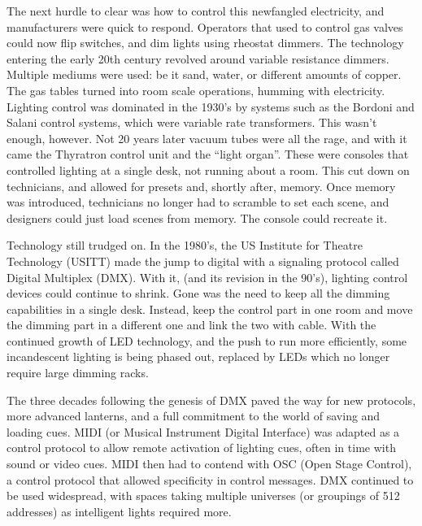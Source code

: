 \documentclass[12pt,twoside]{reedthesis}
\begin{document}
The next hurdle to clear was how to control this newfangled electricity, and manufacturers were quick to respond. Operators that used to control gas valves could now flip switches, and dim lights using rheostat dimmers. The technology entering the early 20th century revolved around variable resistance dimmers. Multiple mediums were used: be it sand, water, or different amounts of copper. The gas tables turned into room scale operations, humming with electricity. Lighting control was dominated in the 1930’s by systems such as the Bordoni and Salani control systems, which were variable rate transformers. 
This wasn’t enough, however. Not 20 years later vacuum tubes were all the rage, and with it came the Thyratron control unit and the “light organ”. These were consoles that controlled lighting at a single desk, not running about a room. This cut down on technicians, and allowed for presets and, shortly after, memory. Once memory was introduced, technicians no longer had to scramble to set each scene, and designers could just load scenes from memory. The console could recreate it.

Technology still trudged on. In the 1980’s, the US Institute for Theatre Technology (USITT) made the jump to digital with a signaling protocol called Digital Multiplex (DMX). With it, (and its revision in the 90’s), lighting control devices could continue to shrink. Gone was the need to keep all the dimming capabilities in a single desk. Instead, keep the control part in one room and move the dimming part in a different one and link the two with cable. With the continued growth of LED technology, and the push to run more efficiently, some incandescent lighting is being phased out, replaced by LEDs which no longer require large dimming racks. 

	The three decades following the genesis of DMX paved the way for new protocols, more advanced lanterns, and a full commitment to the world of saving and loading cues. MIDI (or Musical Instrument Digital Interface) was adapted as a control protocol to allow remote activation of lighting cues, often in time with sound or video cues. MIDI then had to contend with OSC (Open Stage Control), a control protocol that allowed specificity in control messages. DMX continued to be used widespread, with spaces taking multiple universes (or groupings of 512 addresses) as intelligent lights required more.
	 
\end{document}
